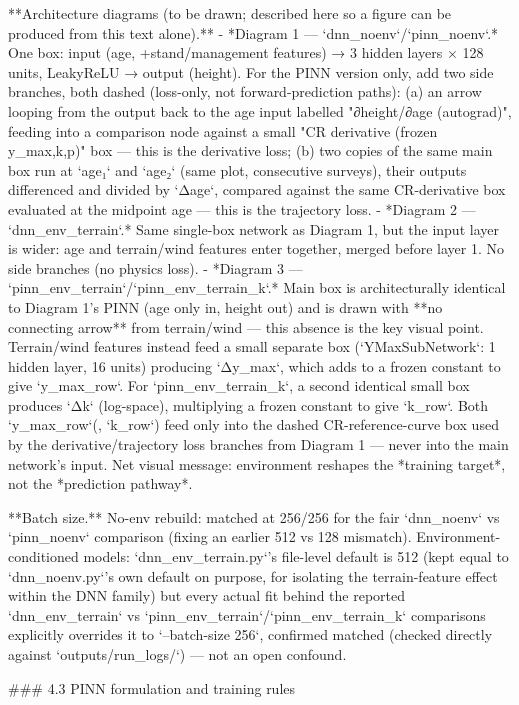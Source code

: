 **Architecture diagrams (to be drawn; described here so a figure can be produced from this text alone).**
- *Diagram 1 — `dnn_noenv`/`pinn_noenv`.* One box: input (age, +stand/management features) → 3 hidden layers × 128 units, LeakyReLU → output (height). For the PINN version only, add two side branches, both dashed (loss-only, not forward-prediction paths): (a) an arrow looping from the output back to the age input labelled "∂height/∂age (autograd)", feeding into a comparison node against a small "CR derivative (frozen y_max,k,p)" box — this is the derivative loss; (b) two copies of the same main box run at `age₁` and `age₂` (same plot, consecutive surveys), their outputs differenced and divided by `Δage`, compared against the same CR-derivative box evaluated at the midpoint age — this is the trajectory loss.
- *Diagram 2 — `dnn_env_terrain`.* Same single-box network as Diagram 1, but the input layer is wider: age and terrain/wind features enter together, merged before layer 1. No side branches (no physics loss).
- *Diagram 3 — `pinn_env_terrain`/`pinn_env_terrain_k`.* Main box is architecturally identical to Diagram 1's PINN (age only in, height out) and is drawn with **no connecting arrow** from terrain/wind — this absence is the key visual point. Terrain/wind features instead feed a small separate box (`YMaxSubNetwork`: 1 hidden layer, 16 units) producing `Δy_max`, which adds to a frozen constant to give `y_max_row`. For `pinn_env_terrain_k`, a second identical small box produces `Δk` (log-space), multiplying a frozen constant to give `k_row`. Both `y_max_row`(, `k_row`) feed only into the dashed CR-reference-curve box used by the derivative/trajectory loss branches from Diagram 1 — never into the main network's input. Net visual message: environment reshapes the *training target*, not the *prediction pathway*.

**Batch size.** No-env rebuild: matched at 256/256 for the fair `dnn_noenv` vs `pinn_noenv` comparison (fixing an earlier 512 vs 128 mismatch). Environment-conditioned models: `dnn_env_terrain.py`'s file-level default is 512 (kept equal to `dnn_noenv.py`'s own default on purpose, for isolating the terrain-feature effect within the DNN family) but every actual fit behind the reported `dnn_env_terrain` vs `pinn_env_terrain`/`pinn_env_terrain_k` comparisons explicitly overrides it to `--batch-size 256`, confirmed matched (checked directly against `outputs/run_logs/`) — not an open confound.

### 4.3 PINN formulation and training rules

